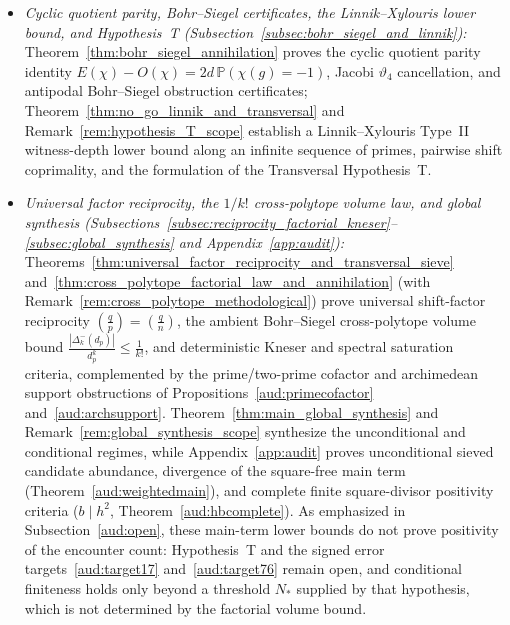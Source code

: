 \documentclass[11pt, a4paper]{article}
\theoremstyle{plain}
\theoremstyle{definition}
\newcommand{\leg}[2]{\left(\frac{#1}{#2}\right)}
\begin{document}
\begin{itemize}
    \item \emph{Cyclic quotient parity, Bohr--Siegel certificates, the Linnik--Xylouris lower bound, and Hypothesis~T (Subsection~\ref{subsec:bohr_siegel_and_linnik}):} Theorem~\ref{thm:bohr_siegel_annihilation} proves the cyclic quotient parity identity $E(\chi)-O(\chi)=2d\,\mathbb{P}(\chi(g)=-1)$, Jacobi $\vartheta_4$ cancellation, and antipodal Bohr--Siegel obstruction certificates; Theorem~\ref{thm:no_go_linnik_and_transversal} and Remark~\ref{rem:hypothesis_T_scope} establish a Linnik--Xylouris Type~II witness-depth lower bound along an infinite sequence of primes, pairwise shift coprimality, and the formulation of the Transversal Hypothesis~T.
    \item \emph{Universal factor reciprocity, the $1/k!$ cross-polytope volume law, and global synthesis (Subsections~\ref{subsec:reciprocity_factorial_kneser}--\ref{subsec:global_synthesis} and Appendix~\ref{app:audit}):} Theorems~\ref{thm:universal_factor_reciprocity_and_transversal_sieve} and~\ref{thm:cross_polytope_factorial_law_and_annihilation} (with Remark~\ref{rem:cross_polytope_methodological}) prove universal shift-factor reciprocity $\leg{q}{p}=\leg{q}{n}$, the ambient Bohr--Siegel cross-polytope volume bound $\frac{|\Delta_k^{-}(d_p)|}{d_p^{k}}\le\frac{1}{k!}$, and deterministic Kneser and spectral saturation criteria, complemented by the prime/two-prime cofactor and archimedean support obstructions of Propositions~\ref{aud:primecofactor} and~\ref{aud:archsupport}. Theorem~\ref{thm:main_global_synthesis} and Remark~\ref{rem:global_synthesis_scope} synthesize the unconditional and conditional regimes, while Appendix~\ref{app:audit} proves unconditional sieved candidate abundance, divergence of the square-free main term (Theorem~\ref{aud:weightedmain}), and complete finite square-divisor positivity criteria ($b\mid h^{2}$, Theorem~\ref{aud:hbcomplete}). As emphasized in Subsection~\ref{aud:open}, these main-term lower bounds do not prove positivity of the encounter count: Hypothesis~T and the signed error targets~\eqref{aud:target17} and~\eqref{aud:target76} remain open, and conditional finiteness holds only beyond a threshold $N_{\ast}$ supplied by that hypothesis, which is not determined by the factorial volume bound.
\end{itemize}
\end{document}
